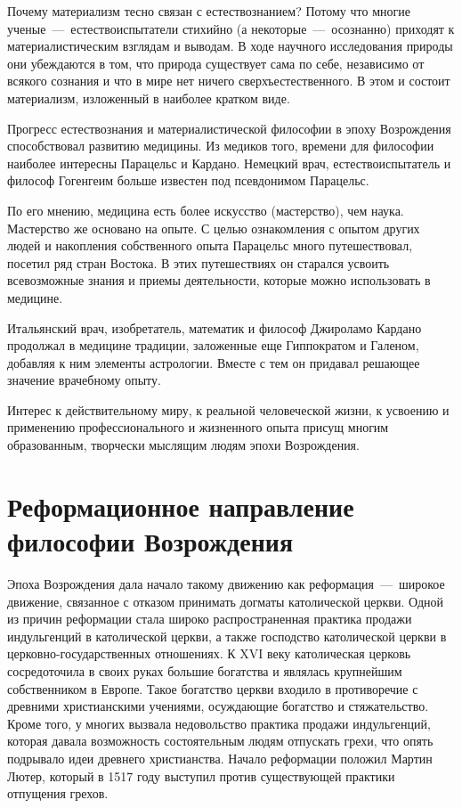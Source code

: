 \documentclass[14pt]{extarticle}
\begin{document}
Почему материализм тесно связан с естествознанием? Потому что многие ученые~---~естествоиспытатели стихийно (а некоторые~---~осознанно) приходят к материалистическим взглядам и выводам. В ходе научного исследования природы они убеждаются в том, что природа существует сама по себе, независимо от всякого сознания и что в мире нет ничего сверхъестественного. В этом и состоит материализм, изложенный в наиболее кратком виде.

Прогресс естествознания и материалистической философии в эпоху Возрождения способствовал развитию медицины. Из медиков того, времени для философии наиболее интересны Парацельс и Кардано. Немецкий врач, естествоиспытатель и философ Гогенгеим больше известен под псевдонимом Парацельс.

По его мнению, медицина есть более искусство (мастерство), чем наука. Мастерство же основано на опыте. С целью ознакомления с опытом других людей и накопления собственного опыта Парацельс много путешествовал, посетил ряд стран Востока. В этих путешествиях он старался усвоить всевозможные знания и приемы деятельности, которые можно использовать в медицине.

Итальянский врач, изобретатель, математик и философ Джироламо Кардано продолжал в медицине традиции, заложенные еще Гиппократом и Галеном, добавляя к ним элементы астрологии. Вместе с тем он придавал решающее значение врачебному опыту. 

Интерес к действительному миру, к реальной человеческой жизни, к усвоению и применению профессионального и жизненного опыта присущ многим образованным, творчески мыслящим людям эпохи Возрождения.

\section{Реформационное направление философии Возрождения}

Эпоха Возрождения дала начало такому движению как реформация~---~широкое движение, связанное с отказом принимать догматы католической цер­кви. Одной из причин реформации стала широко распространенная практика продажи индульгенций в католической церкви, а также господство католической церкви в церковно-государственных отношениях. К XVI веку католическая церковь сосредоточила в своих руках большие богатства и являлась крупнейшим собственником в Европе. Такое богатство церкви входило в противоречие с древними христианскими учениями, осуждающие богатство и стяжательство. Кроме того, у многих вызвала недовольство практика продажи индульгенций, которая давала возможность состоятельным людям отпускать грехи, что опять подрывало идеи древнего христианства. Начало реформации положил Мартин Лютер, который в 1517 году выступил против существующей практики отпущения грехов.
\end{document}
